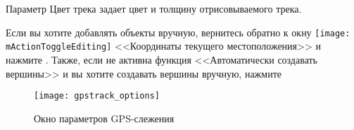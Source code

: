 Параметр Цвет трека задает цвет и толщину отрисовываемого трека.

Если вы хотите добавлять объекты вручную, вернитесь обратно к окну
\texttt{[image: mActionToggleEditing]} <<Координаты
текущего местоположения>> и нажмите . Также, если
не активна функция <<Автоматически создавать вершины>> и вы хотите создавать
вершины вручную, нажмите 

\begin{figure}[ht]
   \centering
   \texttt{[image: gpstrack\_options]}
   \caption{Окно параметров GPS-слежения \nixcaption}
   \label{fig:gpstrack_options}
\end{figure}

\FloatBarrier
